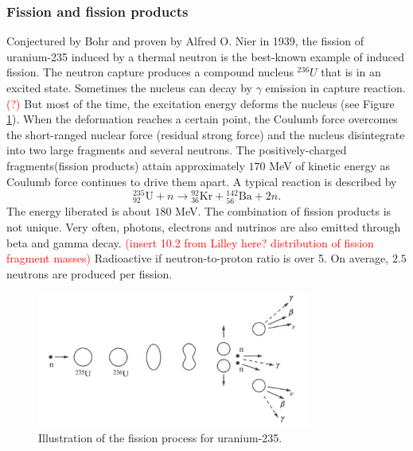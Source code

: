 \documentclass[preprint,aip,cha]{revtex4-1}
\newcommand{\red}[1]{\textcolor{red}{#1}}
\begin{document}
        \subsubsection{Fission and fission products}
        Conjectured by Bohr and proven by Alfred O. Nier in 1939,
        the fission of uranium-235 induced by a thermal neutron
        is the best-known example of induced fission. 
        The neutron capture produces a compound nucleus ${}^{236}U$ that is in an excited state.
        Sometimes the nucleus can decay by $\gamma$ emission in capture reaction. \red{(?)}
        But most of the time, the excitation energy deforms the nucleus (see Figure \ref{fig:fission}).
        When the
        deformation reaches a certain point, the Coulumb force overcomes the short-ranged nuclear
        force (residual strong force) and the nucleus disintegrate into two large fragments and several neutrons. The
        positively-charged fragments(fission products) attain approximately $170$ MeV of kinetic energy as
        Coulumb force continues to drive them apart.\cite{l01}
        A typical reaction is described by
        \[{}^{235}_{92}\text{U} + n \rightarrow {}^{92}_{36}\text{Kr} + {}^{142}_{56}\text{Ba} + 2 n.\]
        The energy liberated is about $180$ MeV. The combination of fission products is not
        unique. \cite{w98, gc01}
        Very often, photons, electrons and nutrinos are also emitted through beta and gamma decay.
        \red{(insert 10.2 from Lilley here? distribution of fission fragment masses)}
        Radioactive if neutron-to-proton ratio is over 5. On average, $2.5$ neutrons are produced per fission.\cite{l01} 
        \begin{figure}[H]
            \centering
            \includegraphics[width=0.8\textwidth]{fission.png}
            \caption{Illustration of the fission process for uranium-235.\cite{l01}}
            \label{fig:fission}
        \end{figure}
\end{document}
